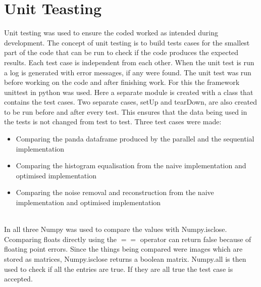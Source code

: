 \section{Unit Teasting}
Unit testing was used to ensure the coded worked as intended during development. The concept of unit testing is to build tests cases for the smallest part of the code that can be run to check if the code produces the expected results. Each test case is independent from each other.  When the unit test is run a log is generated with error messages, if any were found. The unit test was run before working on the code and after finishing work.  For this the framework unittest in python was used.  Here a separate module is created with a class that contains the test cases. Two separate cases, setUp and tearDown, are also created to be run before and after every test. This ensures that the data being used in the tests is not changed from test to test. Three test cases were made:
\begin{itemize}
\item Comparing the panda dataframe produced by the parallel and the sequential implementation
\item Comparing the histogram equalisation from the naive implementation and optimised implementation
\item Comparing the noise removal and reconstruction from the naive implementation and optimised implementation
\end{itemize}
\\
In all three Numpy was used to compare the values with Numpy.isclose. Ccomparing floats directly using the  $==$ operator can return false because of floating point errors. Since the things being compared were images which are stored as matrices, Numpy.isclose returns a boolean matrix. Numpy.all is then used to check if all the entries are true. If they are all true the test case is accepted.